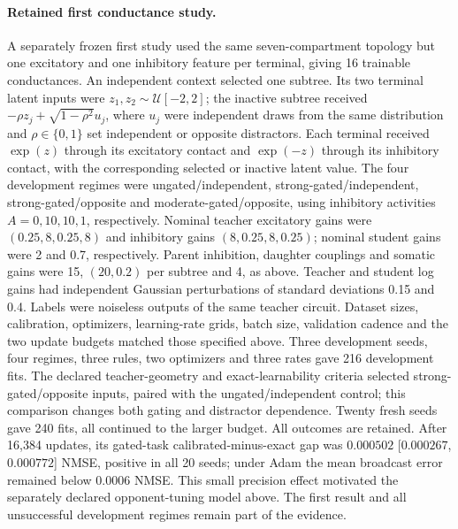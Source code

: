 \paragraph{Retained first conductance study.}
A separately frozen first study used the same seven-compartment topology but one excitatory and one inhibitory feature per terminal, giving 16 trainable conductances. An independent context selected one subtree. Its two terminal latent inputs were $z_1,z_2\sim\mathcal U[-2,2]$; the inactive subtree received $-\rho z_j+\sqrt{1-\rho^2}u_j$, where $u_j$ were independent draws from the same distribution and $\rho\in\{0,1\}$ set independent or opposite distractors. Each terminal received $\exp(z)$ through its excitatory contact and $\exp(-z)$ through its inhibitory contact, with the corresponding selected or inactive latent value. The four development regimes were ungated/independent, strong-gated/independent, strong-gated/opposite and moderate-gated/opposite, using inhibitory activities $A=0,10,10,1$, respectively. Nominal teacher excitatory gains were $(0.25,8,0.25,8)$ and inhibitory gains $(8,0.25,8,0.25)$; nominal student gains were 2 and 0.7, respectively. Parent inhibition, daughter couplings and somatic gains were 15, $(20,0.2)$ per subtree and 4, as above. Teacher and student log gains had independent Gaussian perturbations of standard deviations 0.15 and 0.4. Labels were noiseless outputs of the same teacher circuit. Dataset sizes, calibration, optimizers, learning-rate grids, batch size, validation cadence and the two update budgets matched those specified above. Three development seeds, four regimes, three rules, two optimizers and three rates gave 216 development fits. The declared teacher-geometry and exact-learnability criteria selected strong-gated/opposite inputs, paired with the ungated/independent control; this comparison changes both gating and distractor dependence. Twenty fresh seeds gave 240 fits, all continued to the larger budget. All outcomes are retained. After 16,384 updates, its gated-task calibrated-minus-exact gap was $0.000502$ [$0.000267$, $0.000772$] NMSE, positive in all 20 seeds; under Adam the mean broadcast error remained below 0.0006 NMSE. This small precision effect motivated the separately declared opponent-tuning model above. The first result and all unsuccessful development regimes remain part of the evidence.

